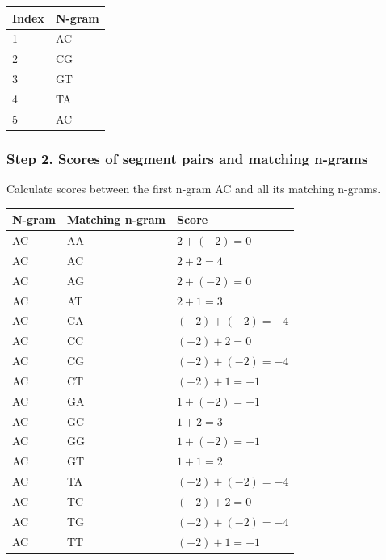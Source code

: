 \begin{table}[h]
\small
\begin{tabular}{|l|l|}
\hline
\textbf{Index} & \textbf{N-gram} \\ \hline
1              & AC              \\ \hline
2              & CG              \\ \hline
3              & GT              \\ \hline
4              & TA              \\ \hline
5              & AC              \\ \hline
\end{tabular}
\end{table}


%
%
\subsubsection*{Step 2. Scores of segment pairs and matching n-grams} 

Calculate scores between the first n-gram AC and all its matching n-grams.
\begin{table}[H]
\small
\begin{tabular}{|l|l|l|}
\hline
\textbf{N-gram} & \textbf{Matching n-gram} & \textbf{Score} \\ \hline
AC              & AA                       & $2+(-2)=0$       \\ \hline
AC              & AC                       & $2+2=4$          \\ \hline
AC              & AG                       & $2+(-2)=0$       \\ \hline
AC              & AT                       & $2+1=3$          \\ \hline
AC              & CA                       & $(-2)+(-2)=-4$   \\ \hline
AC              & CC                       & $(-2)+2=0$       \\ \hline
AC              & CG                       & $(-2)+(-2)=-4$   \\ \hline
AC              & CT                       & $(-2)+1=-1$      \\ \hline
AC              & GA                       & $1+(-2)=-1$      \\ \hline
AC              & GC                       & $1+2=3$          \\ \hline
AC              & GG                       & $1+(-2)=-1$      \\ \hline
AC              & GT                       & $1+1=2$          \\ \hline
AC              & TA                       & $(-2)+(-2)=-4$   \\ \hline
AC              & TC                       & $(-2)+2=0$       \\ \hline
AC              & TG                       & $(-2)+(-2)=-4$   \\ \hline
AC              & TT                       & $(-2)+1=-1$      \\ \hline
\end{tabular}
\end{table}

